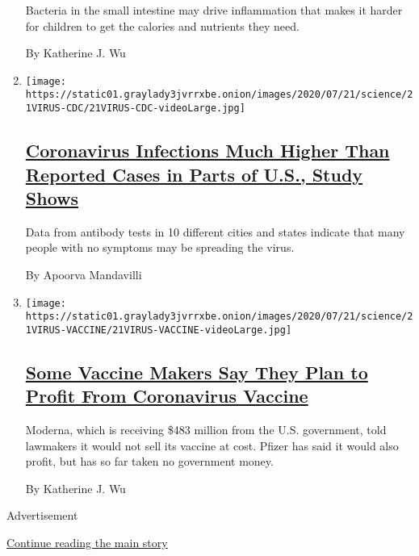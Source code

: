 \begin{enumerate}
  Bacteria in the small intestine may drive inflammation that makes it
  harder for children to get the calories and nutrients they need.

  By Katherine J. Wu
\item
  \texttt{[image: https://static01.graylady3jvrrxbe.onion/images/2020/07/21/science/21VIRUS-CDC/21VIRUS-CDC-videoLarge.jpg]}

  \hypertarget{coronavirus-infections-much-higher-than-reported-cases-in-parts-of-us-study-shows}{%
  \subsection{\texorpdfstring{\href{/2020/07/21/health/coronavirus-infections-us.html}{Coronavirus
  Infections Much Higher Than Reported Cases in Parts of U.S., Study
  Shows}}{Coronavirus Infections Much Higher Than Reported Cases in Parts of U.S., Study Shows}}\label{coronavirus-infections-much-higher-than-reported-cases-in-parts-of-us-study-shows}}

  Data from antibody tests in 10 different cities and states indicate
  that many people with no symptoms may be spreading the virus.

  By Apoorva Mandavilli
\item
  \texttt{[image: https://static01.graylady3jvrrxbe.onion/images/2020/07/21/science/21VIRUS-VACCINE/21VIRUS-VACCINE-videoLarge.jpg]}

  \hypertarget{some-vaccine-makers-say-they-plan-to-profit-from-coronavirus-vaccine}{%
  \subsection{\texorpdfstring{\href{/2020/07/21/health/covid-19-vaccine-coronavirus-moderna-pfizer.html}{Some
  Vaccine Makers Say They Plan to Profit From Coronavirus
  Vaccine}}{Some Vaccine Makers Say They Plan to Profit From Coronavirus Vaccine}}\label{some-vaccine-makers-say-they-plan-to-profit-from-coronavirus-vaccine}}

  Moderna, which is receiving \$483 million from the U.S. government,
  told lawmakers it would not sell its vaccine at cost. Pfizer has said
  it would also profit, but has so far taken no government money.

  By Katherine J. Wu
\end{enumerate}

Advertisement

\protect\hyperlink{after-mid1}{Continue reading the main story}


